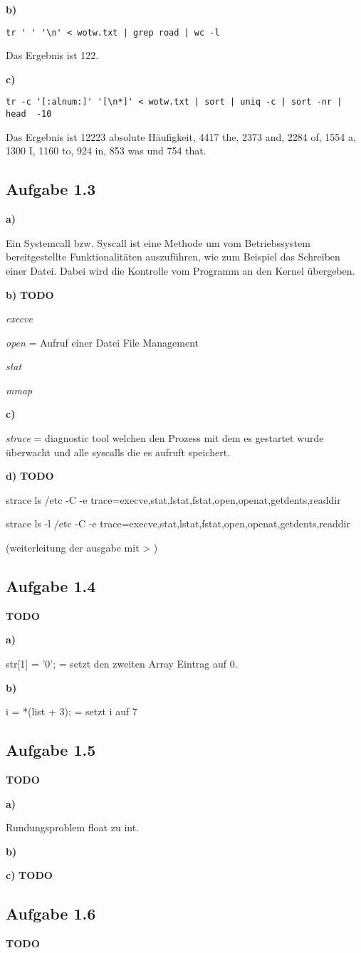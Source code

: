 \documentclass[a4paper,graphics,11pt]{article}
\newcommand{\aufgabe}[1]{\subsection*{Aufgabe #1}}
\begin{document}
\textbf{b)}\\

\begin{verbatim}
tr ' ' '\n' < wotw.txt | grep road | wc -l
\end{verbatim}



Das Ergebnis ist 122.

\textbf{c)}\\

\begin{verbatim}
tr -c '[:alnum:]' '[\n*]' < wotw.txt | sort | uniq -c | sort -nr | head  -10
\end{verbatim}


Das Ergebnis ist 12223 absolute Häufigkeit, 4417 the, 2373 and, 2284 of, 1554 a, 1300 I, 1160 to, 924 in, 853 was und 754 that.

\aufgabe{1.3}
\textbf{a)}

Ein Systemcall bzw. Syscall ist eine Methode um vom Betriebssystem bereitgestellte Funktionalitäten auszuführen, wie zum Beispiel das Schreiben einer Datei. Dabei wird die Kontrolle vom Programm an den Kernel übergeben.

\textbf{b)}
\textbf{TODO}

\textit{execve}

\textit{open} = Aufruf einer Datei File Management

\textit{stat}

\textit{mmap}

\textbf{c)}

\textit{strace} = diagnostic tool welchen den Prozess mit dem es gestartet wurde überwacht und alle syscalls die es aufruft speichert.

\textbf{d)}
\textbf{TODO}

strace ls /etc -C -e trace=execve,stat,lstat,fstat,open,openat,getdents,readdir

strace ls -l /etc -C -e trace=execve,stat,lstat,fstat,open,openat,getdents,readdir

(weiterleitung der ausgabe mit > )

\aufgabe{1.4}
\textbf{TODO}

\textbf{a)}

str[1] = ’0’; = setzt den zweiten Array Eintrag auf 0.

\textbf{b)}

i = *(list + 3); = setzt i auf 7


\aufgabe{1.5}\textbf{TODO}


\textbf{a)}

Rundungsproblem float zu int.

\textbf{b)}



\textbf{c)}
\textbf{TODO}

\aufgabe{1.6}
\textbf{TODO}
\end{document}
